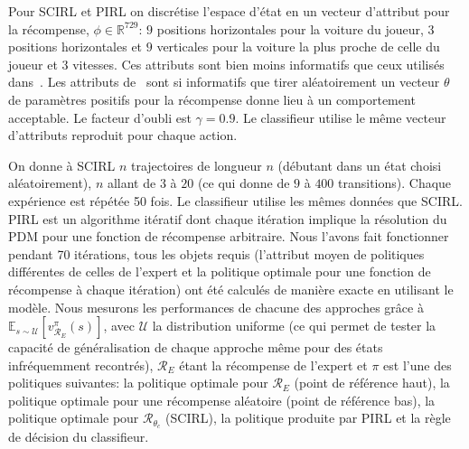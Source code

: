 \documentclass[french,utf8]{./hermes-journal}
\newcommand{\R}{\mathcal{R}}
\newcommand{\E}{\mathbb{E}}
\begin{document}
Pour SCIRL et PIRL on discrétise l'espace d'état en un vecteur d'attribut pour la récompense, $\phi\in\mathbb{R}^{729}$: $9$ positions horizontales pour la voiture du joueur, $3$ positions horizontales et $9$ verticales pour la voiture la plus proche de celle du joueur et $3$ vitesses. Ces attributs sont bien moins informatifs que ceux utilisés dans~\cite{Abbee004,Sye00ame}. Les attributs de~\cite{Sye00ame} sont si informatifs que tirer aléatoirement un vecteur $\theta$ de paramètres positifs pour la récompense donne lieu à un comportement acceptable. Le facteur d'oubli est $\gamma = 0.9$. Le classifieur utilise le même vecteur d'attributs reproduit pour chaque action.

On donne à SCIRL $n$ trajectoires de longueur $n$ (débutant dans un état choisi aléatoirement), $n$ allant de  $3$ à $20$ (ce qui donne de $9$ à
$400$ transitions). Chaque expérience est répétée 50 fois. Le classifieur utilise les mêmes données que SCIRL. PIRL est un algorithme itératif dont chaque itération implique la résolution du PDM pour une fonction de récompense arbitraire. Nous l'avons fait fonctionner pendant 70 itérations, tous les objets requis (l'attribut moyen de politiques différentes de celles de l'expert et la politique optimale pour une fonction de récompense à chaque itération) ont été calculés de manière exacte en utilisant le modèle. Nous mesurons les performances de chacune des approches grâce à $\E_{s\sim \mathcal{U}}[v^\pi_{\R_E}(s)]$, avec $\mathcal{U}$
la distribution uniforme (ce qui permet de tester la capacité de généralisation de chaque approche même pour des états infréquemment recontrés), $\R_E$ étant la récompense de l'expert et $\pi$ est l'une des politiques suivantes: la politique optimale pour $\R_E$ (point de référence haut),
la politique optimale pour une récompense aléatoire (point de référence bas), la politique optimale pour $\R_{\theta_c}$ (SCIRL), la politique produite par PIRL et la règle de décision du classifieur.
\end{document}
